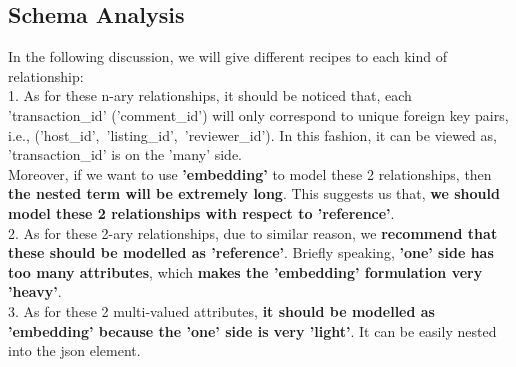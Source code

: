 \documentclass{article}
\begin{document}
	\subsection{Schema Analysis}
	In the following discussion, we will give different recipes to each kind of relationship:
	\vspace{3pt}
	\\
	1. As for these n-ary relationships, it should be noticed that, each 'transaction\_id' ('comment\_id') will only correspond to unique foreign key pairs, i.e., ('host\_id',\ 'listing\_id',\ 'reviewer\_id'). In this fashion, it can be viewed as, 'transaction\_id' is on the 'many' side.
	\\
	Moreover, if we want to use \textbf{'embedding'} to model these 2 relationships, then \textbf{the nested term will be extremely long}. This suggests us that, \textbf{we should model these 2 relationships with respect to 'reference'}.
	\vspace{3pt}
	\\
	2. As for these 2-ary relationships, due to similar reason, we \textbf{recommend that these should be modelled as 'reference'}. Briefly speaking, \textbf{'one' side has too many attributes}, which \textbf{makes the 'embedding' formulation very 'heavy'}.
	\vspace{3pt}
	\\
	3. As for these 2 multi-valued attributes, \textbf{it should be modelled as 'embedding' because the 'one' side is very 'light'}. It can be easily nested into the json element.
\end{document}
